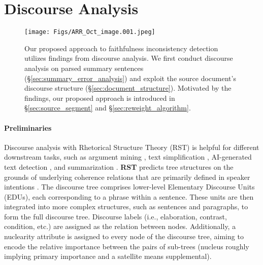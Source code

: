 \vspace{-2mm}
\section{Discourse Analysis}\label{sec:discourse_analysis}

\begin{figure*}[t!]
    \centering
    \texttt{[image: Figs/ARR\_Oct\_image.001.jpeg]}
    \caption{Our proposed approach to faithfulness inconsistency detection utilizes findings from discourse analysis. We first conduct discourse analysis on parsed summary sentences (\S \ref{sec:summary_error_analysis}) and exploit the source document's discourse structure (\S \ref{sec:document_structure}). Motivated by the findings, our proposed approach is introduced in \S  \ref{sec:source_segment} and \S \ref{sec:reweight_algorithm}.  }
    \label{fig:discourse_inspired_detection}
\end{figure*}
\paragraph{Preliminaries}

Discourse analysis with Rhetorical Structure Theory (RST) is helpful for different downstream tasks, such as argument mining \cite{peldszus_stede_2016a, hewett-etal-2019-utility}, text simplification \cite{Zhong_Jiang_Xu_Li_2020},  AI-generated text detection \cite{kim2024threads}, and summarization \cite{Marcu1998tobuild, xu-etal-2020-discourse}. \textbf{RST} predicts tree structures on the grounds of underlying coherence relations
that are primarily defined in speaker intentions \cite{MANNTHOMPSON+1988}. 
The discourse tree comprises lower-level Elementary Discourse Units (EDUs), each corresponding to a phrase within a sentence. These units are then integrated into more complex structures, such as sentences and paragraphs, to form the full discourse tree. Discourse labels (i.e., elaboration, contrast, condition, etc.) are assigned as the relation between nodes. Additionally, a nuclearity attribute is assigned to every node of the discourse tree, aiming to encode the relative importance between the pairs of sub-trees (nucleus roughly implying primary importance and a satellite means supplemental).




